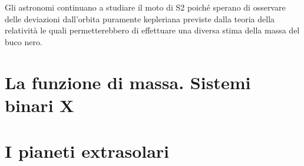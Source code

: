 Gli astronomi continuano a studiare il moto di S2 poiché sperano di osservare
delle deviazioni dall'orbita puramente kepleriana previste dalla teoria della
relatività le quali permetterebbero di effettuare una diversa stima della massa
del buco nero.

\section{La funzione di massa. Sistemi binari X}
\label{sec:funzione-massa}

\section{I pianeti extrasolari}
\label{sec:extrasolari}

